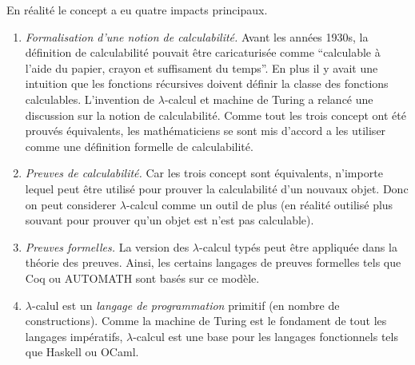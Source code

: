 \documentclass[12pt, a4paper]{article}
\begin{document}
En réalité le concept a eu quatre impacts principaux.
\begin{enumerate}
	\item \emph{Formalisation d'une notion de calculabilité.} Avant les années 1930s, la définition de calculabilité pouvait être caricaturisée comme ``calculable à l'aide du papier, crayon et suffisament du temps''. En plus il y avait une intuition que les fonctions récursives doivent définir la classe des fonctions calculables.
	L'invention de $\lambda$-calcul et machine de Turing a relancé une discussion sur la notion de calculabilité. Comme tout les trois concept ont été prouvés équivalents, les mathématiciens se sont mis d'accord a les utiliser comme une définition formelle de calculabilité.
	\item \emph{Preuves de calculabilité.} Car les trois concept sont équivalents, n'importe lequel peut être utilisé pour prouver la calculabilité d'un nouvaux objet. Donc on peut considerer $\lambda$-calcul comme un outil de plus (en réalité outilisé plus souvant pour prouver qu'un objet est n'est pas calculable).
	\item \emph{Preuves formelles.}
	La version des $\lambda$-calcul typés peut être appliquée dans la théorie des preuves. Ainsi, les certains langages de preuves formelles tels que Coq ou AUTOMATH sont basés sur ce modèle.
	
	\item $\lambda$-calul est un \emph{langage de programmation} primitif (en nombre de constructions). Comme la machine de Turing est le fondament de tout les langages impératifs, $\lambda$-calcul est une base pour les langages fonctionnels tels que Haskell ou OCaml.
\end{enumerate}
\end{document}
